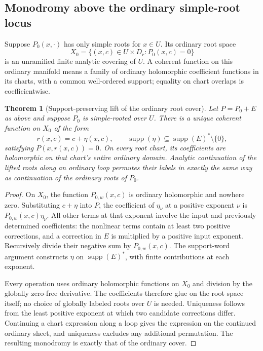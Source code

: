 \documentclass[11pt,oneside]{article}
\numberwithin{equation}{section}
\newtheorem{theorem}{Theorem}[section]
\theoremstyle{definition}
\theoremstyle{remark}\newtheorem{remark}[theorem]{Remark}
\newcommand{\supp}{\operatorname{supp}}
\begin{document}
\subsection{Monodromy above the ordinary simple-root locus}
Suppose \(P_0(x,\cdot)\) has only simple roots for \(x\in U\). Its ordinary root space
\[
 X_0=\{(x,c)\in U\times D_r:P_0(x,c)=0\}
\]
is an unramified finite analytic covering of \(U\). A coherent function on this ordinary manifold means a family of ordinary holomorphic coefficient functions in its charts, with a common well-ordered support; equality on chart overlaps is coefficientwise.

\begin{theorem}[Support-preserving lift of the ordinary root cover]\label{thm:monodromy}
Let \(P=P_0+E\) as above and suppose \(P_0\) is simple-rooted over \(U\). There is a unique coherent function on \(X_0\) of the form
\[
 r(x,c)=c+\eta(x,c),\qquad\supp(\eta)\subseteq\supp(E)^*\setminus\{0\},
\]
satisfying \(P(x,r(x,c))=0\). On every root chart, its coefficients are holomorphic on that chart's entire ordinary domain. Analytic continuation of the lifted roots along an ordinary loop permutes their labels in exactly the same way as continuation of the ordinary roots of \(P_0\).
\end{theorem}
\begin{proof}
On \(X_0\), the function \(P_{0,w}(x,c)\) is ordinary holomorphic and nowhere zero. Substituting \(c+\eta\) into \(P\), the coefficient of \(\eta_\nu\) at a positive exponent \(\nu\) is \(P_{0,w}(x,c)\eta_\nu\). All other terms at that exponent involve the input and previously determined coefficients: the nonlinear terms contain at least two positive corrections, and a correction in \(E\) is multiplied by a positive input exponent. Recursively divide their negative sum by \(P_{0,w}(x,c)\). The support-word argument constructs \(\eta\) on \(\supp(E)^*\), with finite contributions at each exponent.

Every operation uses ordinary holomorphic functions on \(X_0\) and division by the globally zero-free derivative. The coefficients therefore glue on the root space itself; no choice of globally labeled roots over \(U\) is needed. Uniqueness follows from the least positive exponent at which two candidate corrections differ. Continuing a chart expression along a loop gives the expression on the continued ordinary sheet, and uniqueness excludes any additional permutation. The resulting monodromy is exactly that of the ordinary cover.
\end{proof}
\end{document}
